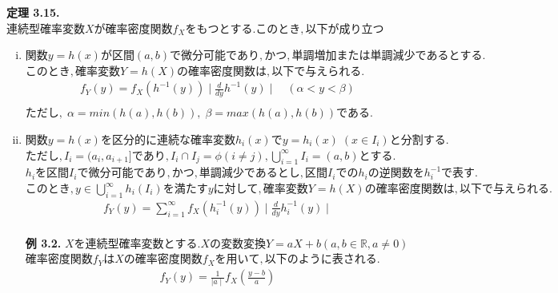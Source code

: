 \documentclass[dvipdfmx,10pt, a4j]{jarticle}
\theoremstyle{definition}
\begin{document}
    \noindent
    \textbf{定理 3.15.} $連続型確率変数 X が確率密度関数 f_X をもつとする. このとき, 以下が成り立つ$\\
    \begin{enumerate}[i)]
        \item $関数y = h(x) が区間 (a, b) で微分可能であり, かつ, 単調増加または単調減少であるとする.$
        $このとき, 確率変数Y = h(X) の確率密度関数は, 以下で与えられる.$\\
        \begin{align*}
            f_Y(y) = f_X(h^{-1}(y)) \mid \frac{d}{dy} h^{-1}(y) \mid \quad (\alpha < y < \beta)\\
        \end{align*}
        $ただし, \; \alpha = min(h(a), h(b)), \; \beta = max(h(a), h(b))である.$\\
        \item $関数y=h(x) を区分的に連続な確率変数h_i(x) で y = h_i(x) \; (x \in I_i) と分割する.$
        $ただし, I_i = (a_i, a_{i+1}] であり, I_i \cap I_j = \phi (i \neq j), \bigcup_{i=1}^{\infty}{I_i} = (a, b)とする.$
        $h_i を区間 I_i で微分可能であり, かつ, 単調減少であるとし, 区間 I_i での h_i の逆関数を h_i^{-1} で表す.$
        $このとき, y \in \bigcup_{i=1}^{\infty}{h_i}(I_i)を満たす y に対して, 確率変数 Y = h(X) の確率密度関数は, 以下で与えられる.$\\
        \begin{align*}
            f_Y(y) = \sum_{i =1}^{\infty}{f_X(h_i^{-1}(y)) \mid \frac{d}{dy} h_i^{-1}(y)} \mid\\
        \end{align*}
        
        \noindent
        \textbf{例 3.2.} $Xを連続型確率変数とする. X の変数変換 Y = aX + b (a, b \in \mathbb{R}, a \neq 0)$
        $確率密度関数 f_Y は X の確率密度関数 f_X を用いて, 以下のように表される.$\\
        \begin{align*}
            f_Y(y) = \frac{1}{\mid a \mid}f_X \left(\frac{y-b}{a} \right)\\
        \end{align*}
        

\end{enumerate}
\end{document}
